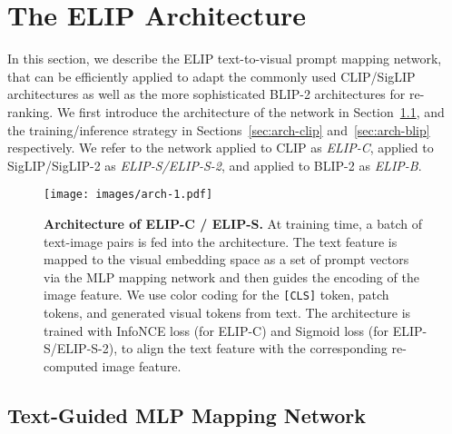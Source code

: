 \section{The ELIP Architecture}
\label{sec:mapping_network}

In this section, we describe the ELIP text-to-visual prompt mapping network, 
that can be efficiently applied to adapt the commonly used CLIP/SigLIP architectures as well as the more sophisticated BLIP-2 architectures for re-ranking. We first introduce the architecture of the network in Section~\ref{sec:network}, and the training/inference strategy in Sections~\ref{sec:arch-clip} and~\ref{sec:arch-blip} respectively. 
We refer to the network applied to CLIP as \emph{ELIP-C}, applied to SigLIP/SigLIP-2 as \emph{ELIP-S/ELIP-S-2}, and applied to BLIP-2 as \emph{ELIP-B}.

\begin{figure}[t]
	\centering
\texttt{[image: images/arch-1.pdf]}
\vspace{-2mm}
	\caption{
\textbf{Architecture of ELIP-C / ELIP-S.}  
At training time, a batch of text-image pairs is fed into the architecture.
The text feature is mapped to the visual embedding space as a set of prompt vectors via the MLP mapping network and then guides the encoding of the image feature. 
We use color coding for the {\color{orange} \texttt{[CLS]} token}, 
{\color{cyan} patch tokens}, and {\color{blue} generated visual tokens} from text. The architecture is trained with InfoNCE loss (for ELIP-C) and Sigmoid loss (for ELIP-S/ELIP-S-2), to align the text feature with the corresponding re-computed image feature.} 
\vspace{-3mm}
\label{fig:arch-1}
\end{figure}

\subsection{Text-Guided MLP Mapping Network}
\label{sec:network}

